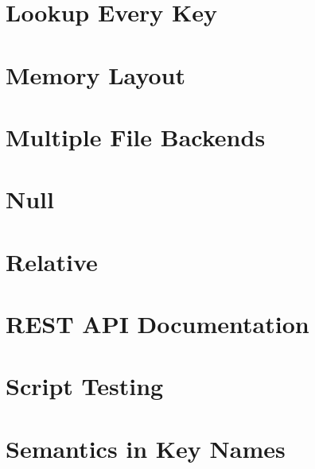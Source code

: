 \let\mypdfximage\pdfximage\def\pdfximage{\immediate\mypdfximage}\documentclass[twoside]{book}
\newcommand{\+}{\discretionary{\mbox{\scriptsize$\hookleftarrow$}}{}{}}
\begin{document}
\chapter{Lookup Every Key}
\label{doc_decisions_6_implemented_lookup_every_key_md}

\chapter{Memory Layout}
\label{doc_decisions_6_implemented_memory_layout_md}

\chapter{Multiple File Backends}
\label{doc_decisions_6_implemented_multiple_file_backends_md}

\chapter{Null}
\label{doc_decisions_6_implemented_null_md}

\chapter{Relative}
\label{doc_decisions_6_implemented_relative_md}

\chapter{REST API Documentation}
\label{doc_decisions_6_implemented_rest_api_documentation_md}

\chapter{Script Testing}
\label{doc_decisions_6_implemented_script_testing_md}

\chapter{Semantics in Key Names}
\label{doc_decisions_6_implemented_semantics_name_md}

\end{document}
